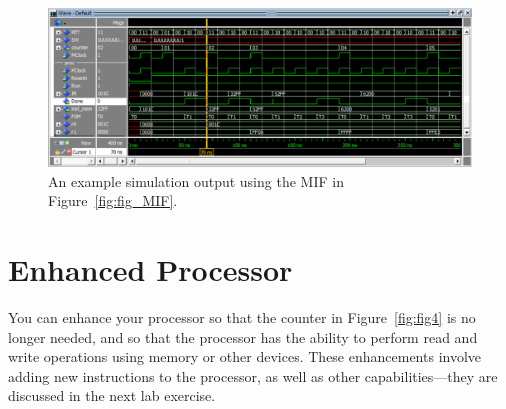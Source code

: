 \documentclass[epsfig,10pt,fullpage]{article} \addtolength{\textwidth}{1.5in}
\begin{document}
\begin{figure}[H]
	\begin{center}
		\includegraphics[width=\textwidth]{figures/figuresim2.png}
	\end{center}
	\caption{An example simulation output using the MIF in Figure~\ref{fig:fig_MIF}.}
	\label{fig:fig_sim2}
\end{figure}

\section*{Enhanced Processor}
You can enhance your processor so that the counter in 
Figure~\ref{fig:fig4} is no longer needed, and so that the processor has the ability to 
perform read and write operations using memory or other devices. These enhancements involve 
adding new instructions to the processor, as well as other capabilities---they are
discussed in the next lab exercise.
\end{document}
